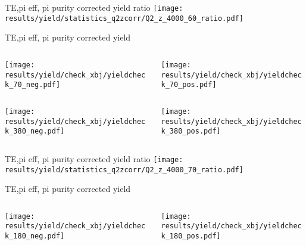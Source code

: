 \begin{frame}{TE,pi eff, pi purity corrected yield ratio}
\texttt{[image: results/yield/statistics\_q2zcorr/Q2\_z\_4000\_60\_ratio.pdf]}
\end{frame}
\begin{frame}{TE,pi eff, pi purity corrected yield}
\begin{columns}
\begin{column}[T]{0.5\textwidth}
\texttt{[image: results/yield/check\_xbj/yieldcheck\_70\_neg.pdf]}
\end{column}
\begin{column}[T]{0.5\textwidth}
\texttt{[image: results/yield/check\_xbj/yieldcheck\_70\_pos.pdf]}
\end{column}
\end{columns}
\begin{columns}
\begin{column}[T]{0.5\textwidth}
\texttt{[image: results/yield/check\_xbj/yieldcheck\_380\_neg.pdf]}
\end{column}
\begin{column}[T]{0.5\textwidth}
\texttt{[image: results/yield/check\_xbj/yieldcheck\_380\_pos.pdf]}
\end{column}
\end{columns}
\end{frame}
\begin{frame}{TE,pi eff, pi purity corrected yield ratio}
\texttt{[image: results/yield/statistics\_q2zcorr/Q2\_z\_4000\_70\_ratio.pdf]}
\end{frame}
\begin{frame}{TE,pi eff, pi purity corrected yield}
\begin{columns}
\begin{column}[T]{0.5\textwidth}
\texttt{[image: results/yield/check\_xbj/yieldcheck\_180\_neg.pdf]}
\end{column}
\begin{column}[T]{0.5\textwidth}
\texttt{[image: results/yield/check\_xbj/yieldcheck\_180\_pos.pdf]}
\end{column}
\end{columns}
\end{frame}
